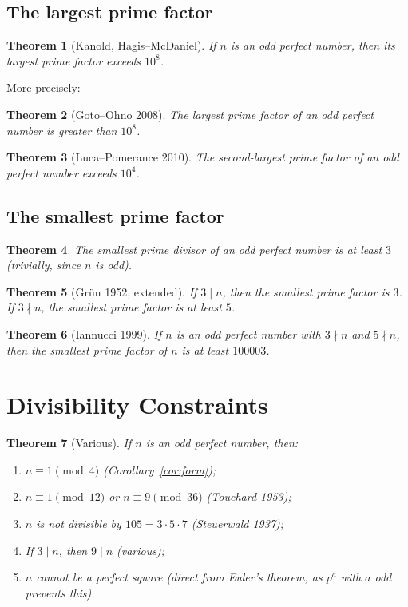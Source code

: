 \documentclass[12pt,a4paper]{amsart}
\newtheorem{theorem}{Theorem}[section]
\theoremstyle{definition}
\theoremstyle{remark}
\begin{document}
\subsection{The largest prime factor}

\begin{theorem}[Kanold, Hagis--McDaniel]
If $n$ is an odd perfect number, then its largest prime factor exceeds $10^8$.
\end{theorem}

More precisely:

\begin{theorem}[Goto--Ohno 2008]
The largest prime factor of an odd perfect number is greater than $10^8$.
\end{theorem}

\begin{theorem}[Luca--Pomerance 2010]
The second-largest prime factor of an odd perfect number exceeds $10^4$.
\end{theorem}

\subsection{The smallest prime factor}

\begin{theorem}
The smallest prime divisor of an odd perfect number is at least $3$
(trivially, since $n$ is odd).
\end{theorem}

\begin{theorem}[Grün 1952, extended]
If $3 \mid n$, then the smallest prime factor is $3$.
If $3 \nmid n$, the smallest prime factor is at least $5$.
\end{theorem}

\begin{theorem}[Iannucci 1999]
If $n$ is an odd perfect number with $3 \nmid n$ and $5 \nmid n$, then the
smallest prime factor of $n$ is at least $100003$.
\end{theorem}

\section{Divisibility Constraints}

\begin{theorem}[Various]
If $n$ is an odd perfect number, then:
\begin{enumerate}[label=(\roman*)]
  \item $n \equiv 1 \pmod{4}$ (Corollary~\ref{cor:form});
  \item $n \equiv 1 \pmod{12}$ or $n \equiv 9 \pmod{36}$ (Touchard 1953);
  \item $n$ is not divisible by $105 = 3 \cdot 5 \cdot 7$ (Steuerwald 1937);
  \item If $3 \mid n$, then $9 \mid n$ (various);
  \item $n$ cannot be a perfect square (direct from Euler's theorem,
        as $p^a$ with $a$ odd prevents this).
\end{enumerate}
\end{theorem}
\end{document}
